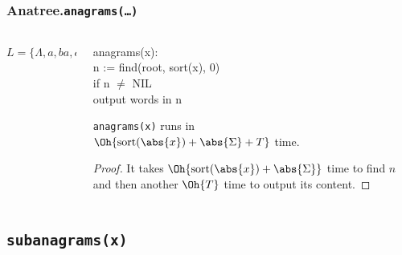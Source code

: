 \documentclass[english, aspectratio=169]{beamer}
\newcommand{\sort}[1]{\text{sort}(#1)}
\begin{document}
\begin{frame}[fragile]
  \frametitle{Anatree.\texttt{anagrams(\dots)}}

  \begin{columns}
    \begin{column}{0.55\textwidth}
      \centering

      \begin{tikzpicture}
        
      \end{tikzpicture}

      $L = \{ \Lambda, a, ba, ca, aba, baa \}$
    \end{column}
    \begin{column}{0.45\textwidth}
      \small\tt

      anagrams(x):\\
      \quad n  := find(root, sort(x), 0)\\
      \quad if n $\neq$ NIL\\
      \qquad output words in n

      \vspace{10pt}

      \begin{corollary}
        \texttt{anagrams(x)} runs in\\$\Oh{\sort{\abs{x}} + \abs{\Sigma} + T}$ time.
      \end{corollary}
      \begin{proof}
        It takes $\Oh{\sort{\abs{x}} + \abs{\Sigma}}$ time to find
        $n$ and then another $\Oh{T}$ time to output its content.
      \end{proof}
    \end{column}
  \end{columns}
\end{frame}

\subsection{\texttt{subanagrams(x)}}
\end{document}
